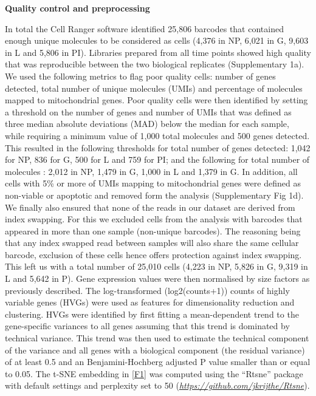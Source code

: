 \documentclass[titlepage, 12pt, oneside]{amsart}
\begin{document}
\textbf{Quality control and preprocessing}

In total the Cell Ranger software identified 25,806 barcodes that contained enough unique molecules to be considered as cells (4,376 in NP, 6,021 in G, 9,603 in L and 5,806 in PI).
Libraries prepared from all time points showed high quality that was reproducible between the two biological replicates (Supplementary 1a).
We used the following metrics to flag poor quality cells: number of genes detected, total number of unique molecules (UMIs) and percentage of molecules mapped to mitochondrial genes.
Poor quality cells were then identified by setting a threshold on the number of genes and number of UMIs that was defined as three median absolute deviations (MAD) below the median for each sample, while requiring a minimum value of 1,000 total molecules and 500 genes detected.  
This resulted in the following thresholds for total number of genes detected: 1,042 for NP, 836 for G, 500 for L and 759 for PI; and the following for total number of molecules : 2,012 in NP, 1,479 in G, 1,000 in L and 1,379 in G.
In addition, all cells with 5\% or more of UMIs mapping to mitochondrial genes were defined as non-viable or apoptotic and removed form the analysis (Supplementary Fig 1d).
We finally also ensured that none of the reads in our dataset are derived from index swapping.
For this we excluded cells from the analysis with barcodes that appeared in more than one sample (non-unique barcodes).
The reasoning being that any index swapped read between samples will also share the same cellular barcode, exclusion of these cells hence offers protection against index swapping.
This left us with a total number of 25,010 cells (4,223 in NP, 5,826 in G, 9,319 in L and 5,642 in P).
Gene expression values were then normalised by size factors as previously described\autocite{Lun2016}.
The log-transformed (log2(counts+1)) counts of highly variable genes (HVGs) were used as features for dimensionality reduction and clustering.
HVGs were identified by first fitting a mean-dependent trend to the gene-specific variances to all genes assuming that this trend is dominated by technical variance.
This trend was then used to estimate the technical component of the variance and all genes with a biological component (the residual variance) of at least 0.5 and an Benjamini-Hochberg adjusted P value smaller than or equal to 0.05.
The t-SNE embedding in \autoref{F1} was computed using the ``Rtsne'' package with default settings and perplexity set to 50 (\href{https://github.com/jkrijthe/Rtsne}{\textit{https://github.com/jkrijthe/Rtsne}}).
\end{document}

